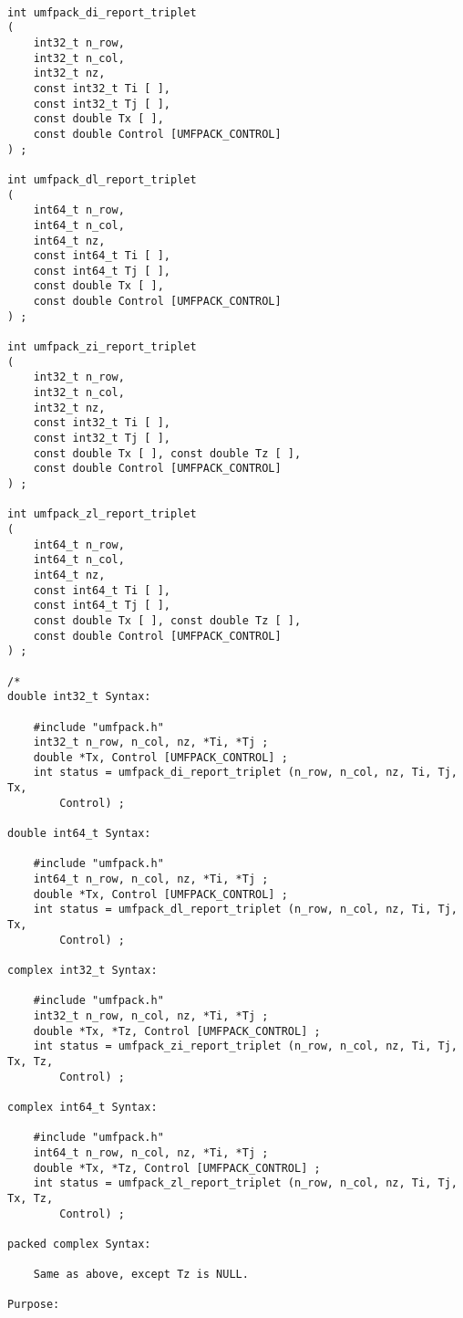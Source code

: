 \documentclass[11pt]{article}
\begin{document}
{\footnotesize
\begin{verbatim}

int umfpack_di_report_triplet
(
    int32_t n_row,
    int32_t n_col,
    int32_t nz,
    const int32_t Ti [ ],
    const int32_t Tj [ ],
    const double Tx [ ],
    const double Control [UMFPACK_CONTROL]
) ;

int umfpack_dl_report_triplet
(
    int64_t n_row,
    int64_t n_col,
    int64_t nz,
    const int64_t Ti [ ],
    const int64_t Tj [ ],
    const double Tx [ ],
    const double Control [UMFPACK_CONTROL]
) ;

int umfpack_zi_report_triplet
(
    int32_t n_row,
    int32_t n_col,
    int32_t nz,
    const int32_t Ti [ ],
    const int32_t Tj [ ],
    const double Tx [ ], const double Tz [ ],
    const double Control [UMFPACK_CONTROL]
) ;

int umfpack_zl_report_triplet
(
    int64_t n_row,
    int64_t n_col,
    int64_t nz,
    const int64_t Ti [ ],
    const int64_t Tj [ ],
    const double Tx [ ], const double Tz [ ],
    const double Control [UMFPACK_CONTROL]
) ;

/*
double int32_t Syntax:

    #include "umfpack.h"
    int32_t n_row, n_col, nz, *Ti, *Tj ;
    double *Tx, Control [UMFPACK_CONTROL] ;
    int status = umfpack_di_report_triplet (n_row, n_col, nz, Ti, Tj, Tx,
        Control) ;

double int64_t Syntax:

    #include "umfpack.h"
    int64_t n_row, n_col, nz, *Ti, *Tj ;
    double *Tx, Control [UMFPACK_CONTROL] ;
    int status = umfpack_dl_report_triplet (n_row, n_col, nz, Ti, Tj, Tx,
        Control) ;

complex int32_t Syntax:

    #include "umfpack.h"
    int32_t n_row, n_col, nz, *Ti, *Tj ;
    double *Tx, *Tz, Control [UMFPACK_CONTROL] ;
    int status = umfpack_zi_report_triplet (n_row, n_col, nz, Ti, Tj, Tx, Tz,
        Control) ;

complex int64_t Syntax:

    #include "umfpack.h"
    int64_t n_row, n_col, nz, *Ti, *Tj ;
    double *Tx, *Tz, Control [UMFPACK_CONTROL] ;
    int status = umfpack_zl_report_triplet (n_row, n_col, nz, Ti, Tj, Tx, Tz,
        Control) ;

packed complex Syntax:

    Same as above, except Tz is NULL.

Purpose:


\end{verbatim}}
\end{document}
